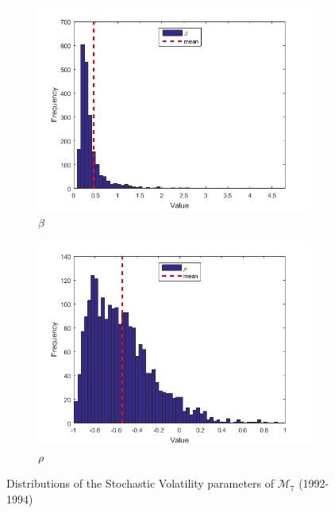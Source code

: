 \documentclass[11pt,a4,twosided,singlespacing,titlepagenumber=on]{scrreprt}
\numberwithin{equation}{chapter} %
\theoremstyle{remark}
\begin{document}
\begin{figure}[H]
\begin{subfigure}[t]{0.32\textwidth}
        \includegraphics[width=1\textwidth]{res/params/731_1462/5}
        \caption{$\beta$}
    \end{subfigure}
    \begin{subfigure}[t]{0.32\textwidth}
        \centering
        \includegraphics[width=1\textwidth]{res/params/731_1462/6}
        \caption{$\rho$}
    \end{subfigure}
    \caption[]{Distributions of the Stochastic Volatility parameters of $\mathcal{M}_7$ (1992-1994)}
    \label{fig:param_dists_1992_1994}
\end{figure}
\end{document}

